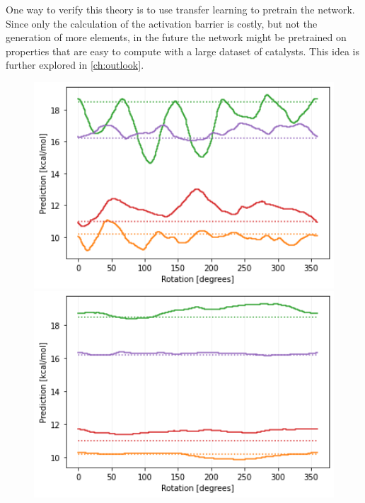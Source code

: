 One way to verify this theory is to use transfer learning to pretrain the network.
Since only the calculation of the activation barrier is costly, but not the generation of more elements,
in the future the network might be pretrained on properties that are easy to compute with a large dataset of catalysts.
This idea is further explored in \ref{ch:outlook}.

\begin{figure}[!htb]
    \includegraphics[width=1.0\textwidth]{figures/regression/snap/aug-5steps-30per.png}
  \endminipage\hfill
  \includegraphics[width=1.0\textwidth]{figures/regression/snap/aug-30steps-30per.png}
  \endminipage\hfill  

\end{figure}
